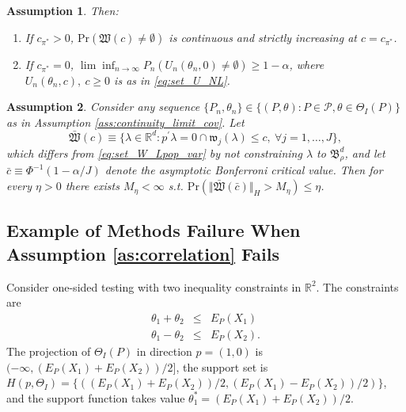 \documentclass[letterpaper,11pt]{article}
\theoremstyle{myplain}
\theoremstyle{mydefinition}
\newtheorem{assumption}{Assumption}[section]
\theoremstyle{myremark}
\newcommand{\R}{\mathbb{R}}
\newcommand{\cP}{\mathcal{P}}
\numberwithin{equation}{section}
\numberwithin{figure}{section}
\begin{document}
\begin{appendices}
\begin{assumption}
Then:
\begin{enumerate}
\item If $c_{\pi^*}>0$, $\mathrm{Pr}\left(\mathfrak{W}(c)\neq \emptyset \right)$ is continuous and strictly increasing at $c=c_{\pi^*}$.
\item If $c_{\pi^*}=0$, $\lim \inf_{n \to \infty} P_n(U_n(\theta_n,0)\neq \emptyset)\ge 1-\alpha$, where $U_n(\theta_n,c),~c\ge 0$ is as in \eqref{eq:set_U_NL}.
\end{enumerate}
\end{assumption}
\begin{assumption}
\label{ass:continuity_limit_cov_II} 
Consider any sequence $\{P_n,\theta_n\} \in \{(P,\theta):P \in \cP,\theta \in \Theta_I(P)\}$ as in Assumption \ref{ass:continuity_limit_cov}.
Let
$$ \bar{\mathfrak{W}}(c)\equiv \big\{ \lambda\in \mathbb R^d: p^\prime \lambda = 0 \cap \mathfrak w_{j}(\lambda)\le c, \: \forall j=1,\dots,J\big\}, $$
which differs from \eqref{eq:set_W_Lpop_var} by not constraining $\lambda$ to $\mathfrak B^d_\rho$, and let $\bar c \equiv \Phi^{-1}(1-\alpha/J)$ denote the asymptotic Bonferroni critical value. Then for every $\eta>0$ there exists $M_\eta<\infty$ s.t. $\mathrm{Pr}(\Vert \bar{\mathfrak{W}}(\bar{c}) \Vert_H > M_\eta) \leq \eta$. 
\end{assumption}

\subsection{Example of Methods Failure When Assumption \ref{as:correlation} Fails}
\label{sec:counterexample}
Consider one-sided testing with two inequality constraints in $\R^2$. The
constraints are
\begin{eqnarray*}
\theta _{1}+\theta _{2} &\leq &E_P(X_1) \\
\theta _{1}-\theta _{2} &\leq &E_P(X_2).
\end{eqnarray*}
The projection of $\Theta_I(P)$ in direction $p=(1,0)$ is $(-\infty,(E_P(X_1)+E_P(X_2))/2]$, the support set is $H(p,\Theta_I)=\{((E_P(X_1)+E_P(X_2))/2,(E_P(X_1)-E_P(X_2))/2)\}$, and the support function takes value $\theta_1^*=(E_P(X_1)+E_P(X_2))/2$.


\end{appendices}
\end{document}
